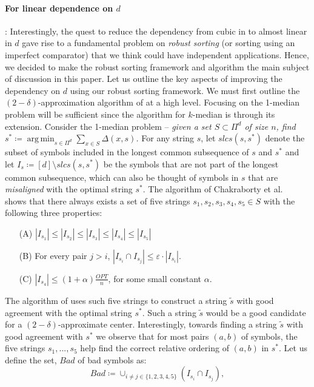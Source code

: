 \documentclass[11pt]{llncs}
\DeclareMathOperator*{\argmin}{arg\,min}
\newcommand{\veps}{\varepsilon}
\begin{document}
\paragraph{\bf For linear dependence on $d$}: Interestingly, the quest to reduce the dependency from cubic in \cite{cdk23} to almost linear in $d$ gave rise to a fundamental problem on {\em robust sorting} (or sorting using an imperfect comparator) that we think could have independent applications. Hence, we decided to make the robust sorting framework and algorithm the main subject of discussion in this paper. 
Let us outline the key aspects of improving the dependency on $d$ using our robust sorting framework. 
We must first outline the $(2-\delta)$-approximation algorithm of \cite{cdk23} at a high level. Focusing on the 1-median problem will be sufficient since the algorithm for $k$-median is through its extension.
Consider the 1-median problem -- {\it given a set $S \subset \Pi^d$ of size $n$, find $s^* \coloneqq \argmin_{s \in \Pi^d} \sum_{x \in S} \Delta(x, s)$.}
For any string $s$, let $slcs(s, s^*)$ denote the subset of symbols included in the longest common subsequence of $s$ and $s^*$ and let $I_{s} \coloneqq [d]\setminus slcs(s, s^*)$ be the symbols that are not part of the longest common subsequence, which can also be thought of symbols in $s$ that are {\em misaligned} with the optimal string $s^*$.
The algorithm of Chakraborty et al.~\cite{cdk23} shows that there always exists a set of five strings $s_1, s_2, s_3, s_4, s_5 \in S$ with the following three properties: 
\begin{enumerate}
\item[(A)] $|I_{s_1}| \leq |I_{s_2}| \leq |I_{s_3}| \leq |I_{s_4}| \leq |I_{s_5}|$
\item[(B)] For every pair $j > i$, $|I_{s_i} \cap I_{s_j}| \leq \veps \cdot |I_{s_i}|$.
\item[(C)] $|I_{s_4}| \leq (1+\alpha)\frac{OPT}{n}$, for some small constant $\alpha$.
\end{enumerate}
The algorithm of \cite{cdk23} uses such five strings to construct a string $\tilde{s}$ with good agreement with the optimal string $s^*$. 
Such a string $\tilde{s}$ would be a good candidate for a $(2 - \delta)$-approximate center.
Interestingly, towards finding a string $\tilde{s}$ with good agreement with $s^*$ we observe that for most pairs $(a, b)$ of symbols, the five strings $s_1, ..., s_5$ help find the correct relative ordering of $(a, b)$ in $s^*$. Let us define the set, $Bad$ of bad symbols as:
$$
Bad \coloneqq \cup_{i \neq j \in \{1, 2, 3, 4, 5\}} (I_{s_i} \cap I_{s_j}), 
$$
\end{document}
